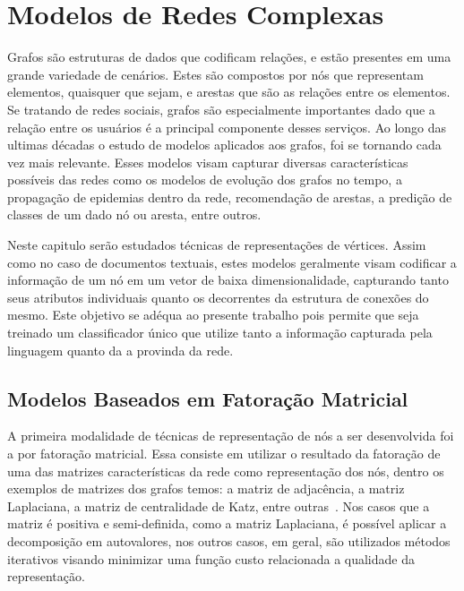 \chapter{Modelos de Redes Complexas}
\label{chapter:networks}

Grafos são estruturas de dados que codificam relações, e estão presentes em uma
grande variedade de cenários.
Estes são compostos por nós que representam elementos, quaisquer que sejam, e
arestas que são as relações entre os elementos.
Se tratando de redes sociais, grafos são especialmente importantes dado que
a relação entre os usuários é a principal componente desses serviços.
Ao longo das ultimas décadas o estudo de modelos aplicados aos grafos, foi se
tornando cada vez mais relevante.
Esses modelos visam capturar diversas características possíveis das redes como
os modelos de evolução dos grafos no tempo, a propagação de epidemias dentro da
rede, recomendação de arestas, a predição de classes de um dado nó ou aresta,
entre outros.

Neste capitulo serão estudados técnicas de representações de vértices.
Assim como no caso de documentos textuais, estes modelos geralmente visam
codificar a informação de um nó em um vetor de baixa dimensionalidade,
capturando tanto seus atributos individuais quanto os decorrentes da estrutura
de conexões do mesmo.
Este objetivo se adéqua ao presente trabalho pois permite que seja treinado um
classificador único que utilize tanto a informação capturada pela linguagem quanto
da a provinda da rede.




\section{Modelos Baseados em Fatoração Matricial}

A primeira modalidade de técnicas de representação de nós a ser desenvolvida foi
a por fatoração matricial.
Essa consiste em utilizar o resultado da fatoração de uma das matrizes
características da rede como representação dos nós, dentro os exemplos de
matrizes dos grafos temos: a matriz de adjacência, a matriz Laplaciana, a matriz
de centralidade de Katz, entre outras~\cite{goyal18}.
Nos casos que a matriz é positiva e semi-definida, como a matriz Laplaciana, é
possível aplicar a decomposição em autovalores, nos outros casos, em geral, são
utilizados métodos iterativos visando minimizar uma função custo relacionada a
qualidade da representação.

